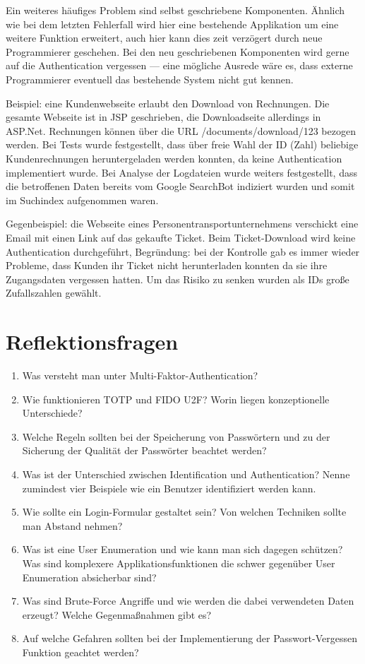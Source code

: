 Ein weiteres häufiges Problem sind selbst geschriebene Komponenten. Ähnlich wie bei dem letzten Fehlerfall wird hier eine bestehende Applikation um eine weitere Funktion erweitert, auch hier kann dies zeit verzögert durch neue Programmierer geschehen. Bei den neu geschriebenen Komponenten wird gerne auf die Authentication vergessen --- eine mögliche Ausrede wäre es, dass externe Programmierer eventuell das bestehende System nicht gut kennen.

Beispiel: eine Kundenwebseite erlaubt den Download von Rechnungen. Die gesamte Webseite ist in JSP geschrieben, die Downloadseite allerdings in ASP.Net. Rechnungen können über die URL /documents/download/123 bezogen werden. Bei Tests wurde festgestellt, dass über freie Wahl der ID (Zahl) beliebige Kundenrechnungen heruntergeladen werden konnten, da keine Authentication implementiert wurde. Bei Analyse der Logdateien wurde weiters festgestellt, dass die betroffenen Daten bereits vom Google SearchBot indiziert wurden und somit im Suchindex aufgenommen waren.

Gegenbeispiel: die Webseite eines Personentransportunternehmens verschickt eine Email mit einen Link auf das gekaufte Ticket. Beim Ticket-Download wird keine Authentication durchgeführt, Begründung: bei der Kontrolle gab es immer wieder Probleme, dass Kunden ihr Ticket nicht herunterladen konnten da sie ihre Zugangsdaten vergessen hatten. Um das Risiko zu senken wurden als IDs große Zufallszahlen gewählt.

\section{Reflektionsfragen}

\begin{enumerate}
	\item Was versteht man unter Multi-Faktor-Authentication?
	\item Wie funktionieren TOTP und FIDO U2F? Worin liegen konzeptionelle Unterschiede?
	\item Welche Regeln sollten bei der Speicherung von Passwörtern und zu der Sicherung der Qualität der Passwörter beachtet werden?
	\item Was ist der Unterschied zwischen Identification und Authentication? Nenne zumindest vier Beispiele wie ein Benutzer identifiziert werden kann.
	\item Wie sollte ein Login-Formular gestaltet sein? Von welchen Techniken sollte man Abstand nehmen?
	\item Was ist eine User Enumeration und wie kann man sich dagegen schützen? Was sind komplexere Applikationsfunktionen die schwer gegenüber User Enumeration absicherbar sind?
	\item Was sind Brute-Force Angriffe und wie werden die dabei verwendeten Daten erzeugt? Welche Gegenmaßnahmen gibt es?
	\item Auf welche Gefahren sollten bei der Implementierung der Passwort-Vergessen Funktion geachtet werden?
\end{enumerate}
